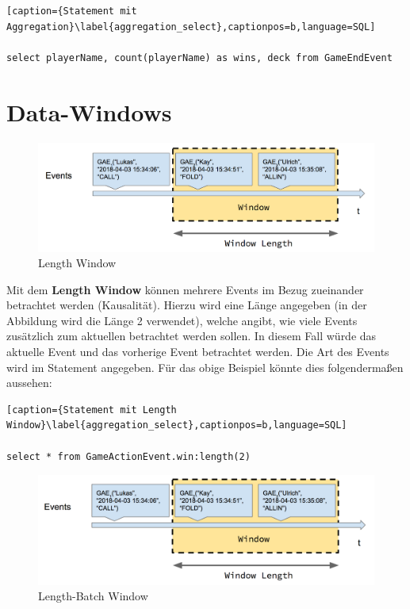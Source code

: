 \begin{lstlisting}[caption={Statement mit Aggregation}\label{aggregation_select},captionpos=b,language=SQL]

select playerName, count(playerName) as wins, deck from GameEndEvent

\end{lstlisting}

\section{Data-Windows}
\label{Data-Windows}
\begin{figure}[ht]
	\centering
	\includegraphics[width=\textwidth,height=\textheight,keepaspectratio]{images/data_window_length.png}
	\caption{Length Window}
	\label{LengthWindow}
\end{figure}

Mit dem \textbf{Length Window} können mehrere Events im Bezug zueinander betrachtet werden (Kausalität). Hierzu wird eine Länge angegeben (in der Abbildung wird die Länge 2 verwendet), welche angibt, wie viele Events zusätzlich zum aktuellen betrachtet werden sollen. In diesem Fall würde das aktuelle Event und das vorherige Event betrachtet werden. Die Art des Events wird im Statement angegeben. Für das obige Beispiel könnte dies folgendermaßen aussehen:

\begin{lstlisting}[caption={Statement mit Length Window}\label{aggregation_select},captionpos=b,language=SQL]

select * from GameActionEvent.win:length(2)

\end{lstlisting}

\begin{figure}[ht]
	\centering
	\includegraphics[width=\textwidth,height=\textheight,keepaspectratio]{images/data_window_length_batch.png}
	\caption{Length-Batch Window}
	\label{LengthBatchWindow}
\end{figure}

